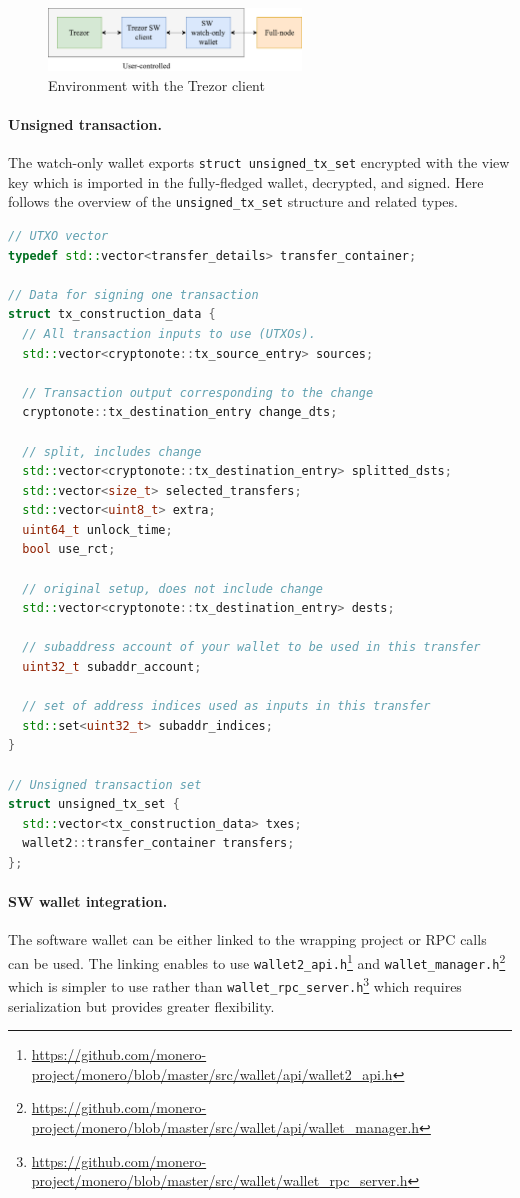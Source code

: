 \documentclass[]{article}
\begin{document}
\begin{figure}[H]
	\centering
	\includegraphics[width=0.6\textwidth, angle=0]{img/trezor-int.pdf}
	\caption{Environment with the Trezor client}
\end{figure}

\paragraph{Unsigned transaction.}
The watch-only wallet exports \verb|struct unsigned_tx_set| encrypted with the view key which is imported in the fully-fledged wallet, decrypted, and signed. Here follows the overview of the \verb|unsigned_tx_set| structure and related types.

\begin{lstlisting}[language=c++]
// UTXO vector
typedef std::vector<transfer_details> transfer_container;

// Data for signing one transaction
struct tx_construction_data {
  // All transaction inputs to use (UTXOs).
  std::vector<cryptonote::tx_source_entry> sources;
  
  // Transaction output corresponding to the change
  cryptonote::tx_destination_entry change_dts;
  
  // split, includes change
  std::vector<cryptonote::tx_destination_entry> splitted_dsts; 
  std::vector<size_t> selected_transfers;
  std::vector<uint8_t> extra;
  uint64_t unlock_time;
  bool use_rct;
  
  // original setup, does not include change
  std::vector<cryptonote::tx_destination_entry> dests; 
  
  // subaddress account of your wallet to be used in this transfer
  uint32_t subaddr_account;  
  
  // set of address indices used as inputs in this transfer
  std::set<uint32_t> subaddr_indices;  
}

// Unsigned transaction set
struct unsigned_tx_set {
  std::vector<tx_construction_data> txes;
  wallet2::transfer_container transfers;
};
\end{lstlisting}

\paragraph{SW wallet integration.} The software wallet can be either linked to the wrapping project or RPC calls can be used. The linking enables to use \verb|wallet2_api.h|\footnote{\url{https://github.com/monero-project/monero/blob/master/src/wallet/api/wallet2_api.h}} and \verb|wallet_manager.h|\footnote{\url{https://github.com/monero-project/monero/blob/master/src/wallet/api/wallet_manager.h}} which is simpler to use rather than \verb|wallet_rpc_server.h|\footnote{\url{https://github.com/monero-project/monero/blob/master/src/wallet/wallet_rpc_server.h}} which requires serialization but provides greater flexibility.
\end{document}
